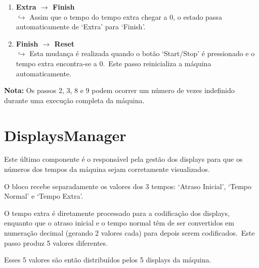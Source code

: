 \begin{enumerate}
    \item \textbf{Extra $\rightarrow$ Finish}
        \\$\hookrightarrow$ Assim que o tempo do tempo extra chegar a 0, o estado passa automaticamente de `Extra' para `Finish'.
    \item \textbf{Finish $\rightarrow$ Reset}
        \\$\hookrightarrow$ Esta mudança é realizada quando o botão `Start/Stop' é pressionado e o tempo extra encontra-se a 0.\ Este passo reinicializa a máquina automaticamente.
\end{enumerate}

\textbf{Nota:} Os passos 2, 3, 8 e 9 podem ocorrer um número de vezes indefinido durante uma execução completa da máquina.

\section{DisplaysManager}
\label{sec:displays-manager}
Este último componente é o responsável pela gestão dos displays para que os números dos tempos da máquina sejam corretamente visualizados.

O bloco recebe separadamente os valores dos 3 tempos: `Atraso Inicial', `Tempo Normal' e `Tempo Extra'.

O tempo extra é diretamente processado para a codificação dos displays, enquanto que o atraso inicial e o tempo normal têm de ser convertidos em numeração decimal (gerando 2 valores cada) para depois serem codificados.\ Este passo produz 5 valores diferentes.

Esses 5 valores são então distribuídos pelos 5 displays da máquina.